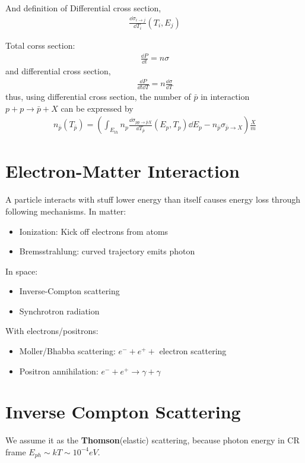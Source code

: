 \documentclass{sciposter}
\begin{document}
\begin{multicols}{3}
And definition of Differential cross section,
\begin{align}
    \frac{\dd{\sigma_{i\rightarrow j} }}{\dd{T_{i} }}(T_{i},E_{j}  )
\end{align}

Total corss section: 
\begin{align}
    \frac{\dd{P}}{\dd{t}}=n\sigma
\end{align}
and differential cross section,
\begin{align}
    \frac{\dd{P}}{\dd{t}\dd{T}}=n\frac{\dd{\sigma}}{\dd{T}}
\end{align}
thus, using differential cross section, the number of $\bar{p}$ in interaction $p+p\rightarrow \bar{p}+X$ can be expressed by
\begin{align}
    n_{\bar{p}}(T_{\bar{p}} ) =\left(\int_{E_{th} }n_{p}\frac{\dd{\sigma_{pp\rightarrow\bar{p}X} }}{\dd{T_{\bar{p}} }}(E_{p},T_{p}  )\dd{E_{p} }-n_{\bar{p}}\sigma_{\bar{p}\rightarrow X}    \right)\frac{X}{m}
\end{align}



\section{Electron-Matter Interaction}
A particle interacts with stuff lower energy than
itself causes energy loss through following mechanisms. In matter:
\begin{itemize}
    \item Ionization: Kick off electrons from atoms
    \item Bremsstrahlung: curved trajectory emits photon
\end{itemize}
In space:
\begin{itemize}
    \item Inverse-Compton scattering
    \item Synchrotron radiation
\end{itemize}
With electrons/positrons:
\begin{itemize}
    \item Moller/Bhabba scattering: $e^{-} +e^{+}+ $ electron scattering
    \item Positron annihilation: $e^{-}+e^{+}\rightarrow \gamma+\gamma  $
\end{itemize}

\section{Inverse Compton Scattering}
We assume it as the \textbf{Thomson}(elastic) scattering, because photon energy in CR frame $E_{ph} \sim kT \sim 10^{-4}eV $.


\end{multicols}
\end{document}
